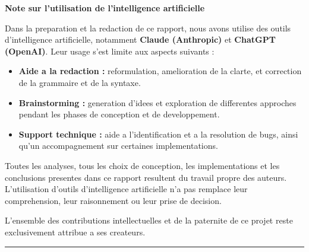 \newpage
\thispagestyle{fancy}

\begin{center}
  {\normalsize\bfseries Note sur l'utilisation de l'intelligence artificielle}
\end{center}

\vspace{0.4em}

\noindent Dans la preparation et la redaction de ce rapport, nous avons utilise
des outils d'intelligence artificielle, notamment \textbf{Claude (Anthropic)} et
\textbf{ChatGPT (OpenAI)}. Leur usage s'est limite aux aspects suivants :

\begin{itemize}[topsep=4pt, itemsep=2pt]
  \item \textbf{Aide a la redaction :} reformulation, amelioration de la clarte,
        et correction de la grammaire et de la syntaxe.
  \item \textbf{Brainstorming :} generation d'idees et exploration de differentes
        approches pendant les phases de conception et de developpement.
  \item \textbf{Support technique :} aide a l'identification et a la resolution
        de bugs, ainsi qu'un accompagnement sur certaines implementations.
\end{itemize}

\noindent Toutes les analyses, tous les choix de conception, les implementations
et les conclusions presentes dans ce rapport resultent du travail propre des auteurs.
L'utilisation d'outils d'intelligence artificielle n'a pas remplace leur
comprehension, leur raisonnement ou leur prise de decision.

\noindent L'ensemble des contributions intellectuelles et de la paternite de ce
projet reste exclusivement attribue a ses createurs.

\vspace{0.6em}
\begin{center}
  \rule{0.5\linewidth}{0.4pt}
\end{center}
